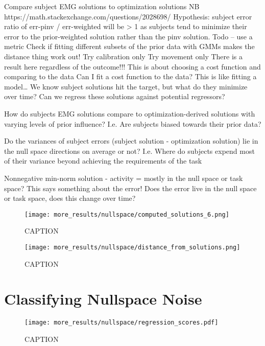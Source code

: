 \documentclass[../main.tex]{subfiles}
\begin{document}
Compare subject EMG solutions to optimization solutions
NB https://math.stackexchange.com/questions/2028698/
Hypothesis: subject error ratio of err-pinv / err-weighted will be > 1 as subjects tend to minimize their error to the prior-weighted solution rather than the pinv solution.
Todo – use a metric
Check if fitting different subsets of the prior data with GMMs makes the distance thing work out! 
Try calibration only
Try movement only
There is a result here regardless of the outcome!!!
This is about choosing a cost function and comparing to the data
Can I fit a cost function to the data? This is like fitting a model… 
We know subject solutions hit the target, but what do they minimize over time?
Can we regress these solutions against potential regressors?

How do subjects EMG solutions compare to optimization-derived solutions with varying levels of prior influence? I.e. Are subjects biased towards their prior data?

Do the variances of subject errors (subject solution - optimization solution) lie in the null space directions on average or not? I.e. Where do subjects expend most of their variance beyond achieving the requirements of the task 

Nonnegative min-norm solution - activity = mostly in the null space or task space? This says something about the error! Does the error live in the null space or task space, does this change over time?

\begin{figure}[H]
  \centering
    \texttt{[image: more\_results/nullspace/computed\_solutions\_6.png]}
    \caption[Computed solutions]{CAPTION}\label{fig:computed_solutions}
\end{figure}

\begin{figure}[H]
  \centering
    \texttt{[image: more\_results/nullspace/distance\_from\_solutions.png]}
    \caption[Distance from computed solutions]{CAPTION}\label{fig:computed_distances}
\end{figure}


\section{Classifying Nullspace Noise}


\begin{figure}[H]
  \centering
    \texttt{[image: more\_results/nullspace/regression\_scores.pdf]}
    \caption[regression scores]{CAPTION}\label{fig:regression_scores}
\end{figure}
\end{document}
